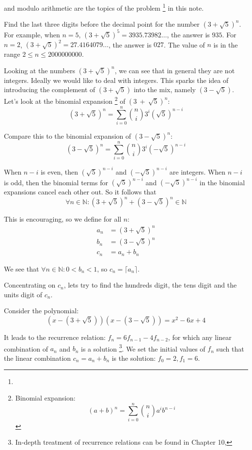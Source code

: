  and modulo arithmetic are the topics of the problem \footnote{} in this note.

\vspace{10 mm}
\begin{problem}
Find the last three digits before the decimal point for the number $(3 + \sqrt{5})^n$. For example, when $n = 5$, $(3 + \sqrt{5})^5 = 3935.73982\ldots$, the answer is $935$. For $n = 2$, $(3 + \sqrt{5})^2 = 27.4164079\ldots$, the answer is $027$.  The value of $n$ is in the range $2 \le n \le 2000000000$. 
\end{problem}

Looking at the numbers $(3 + \sqrt{5})^n$, we can see that in general they are not integers. Ideally we would like to deal with integers. This sparks the idea of introducing the complement of $(3 + \sqrt{5})$ into the mix, namely $(3 - \sqrt{5})$. Let's look at the binomial expansion 
\footnote{Binomial expansion:
\[
(a + b)^n = \sum^{n}_{i=0} \binom{n}{i} a^{i}b^{n-i}
\]
} of $(3~+~\sqrt{5})^n$:
\[
	(3 + \sqrt{5})^n = \sum^{n}_{i=0} \binom{n}{i} 3^{i}(\sqrt{5})^{n-i}
\]

\noindent Compare this to the binomial expansion of $(3 - \sqrt{5})^n$:
\[
	(3 - \sqrt{5})^n = \sum^{n}_{i=0} \binom{n}{i} 3^{i}(-\sqrt{5})^{n-i}
\]

\noindent When $n-i$ is even, then $(\sqrt{5})^{n-i}$ and $(-\sqrt{5})^{n-i}$ are integers. When $n-i$ is odd, then the binomial terms  for $(\sqrt{5})^{n-i}$ and $(-\sqrt{5})^{n-i}$  in the binomial expansions cancel each other out. So it follows that
\[
 	\forall n \in \mathbb{N}: (3 + \sqrt{5})^n + (3 - \sqrt{5})^n \in \mathbb{N}
\]

\noindent This is encouraging, so we define for all $n$:
\[
\begin{split}
	a_n & = (3 + \sqrt{5})^n \\
	b_n & = (3 - \sqrt{5})^n \\
	c_n & = a_n + b_n
\end{split}	
\]

\noindent We see that $\forall n \in \mathbb{N}: 0 < b_n < 1$, so $c_n=\lceil a_n \rceil$.

Concentrating on $c_n$, lets try to find the hundreds digit, the tens digit and the units digit of $c_n$.

Consider the polynomial:
\[
	(x - (3 + \sqrt{5})) (x - (3 - \sqrt{5})) = x^2 - 6x + 4
\]

\noindent It leads to the recurrence relation: $f_n = 6 f_{n-1} - 4 f_{n-2}$, for which any linear combination of  $a_n$ and $b_n$ is a solution \footnote{In-depth treatment of recurrence relations can be found in Chapter 10, }. We set the initial values of $f_n$ such that the linear combination $c_n=a_n + b_n$ is the solution: $f_0=2, f_1=6$.

